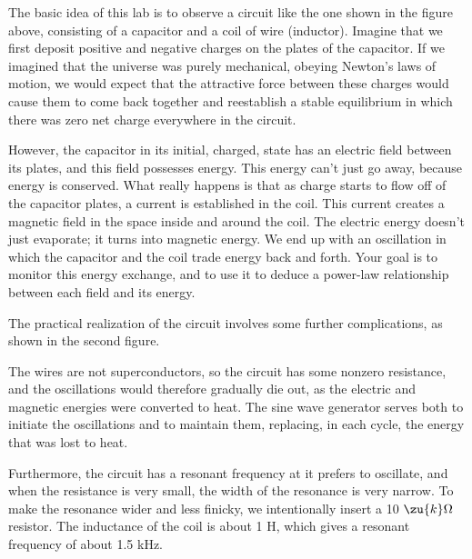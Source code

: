\label{lab:energy-in-fields}

\apparatus
{}


\introduction

The basic idea of this lab is to observe a circuit like the one shown in
the figure above, consisting of a capacitor and a coil of wire (inductor).
Imagine that we first deposit positive and negative
charges on the plates of the capacitor. If we imagined that the universe was
purely mechanical, obeying Newton's laws of motion,
we would expect that the attractive force between these charges
would cause them to come back together and reestablish a stable equilibrium
in which there was zero net charge everywhere in the circuit.

However, the capacitor in its initial, charged, state has an electric 
field between its plates, and this field possesses energy. This energy
can't just go away, because energy is conserved. What really happens is
that as charge starts to flow off of the capacitor plates, a current is
established in the coil. This current creates a magnetic field in the space
inside and around the coil. The electric energy doesn't just evaporate;
it turns into magnetic energy. We end up with an oscillation in which the
capacitor and the coil trade energy back and forth. Your goal is to
monitor this energy exchange, and to use it to deduce a power-law
relationship between each field and its energy.

The practical realization of the circuit involves some further
complications, as shown in the second figure. 

The wires are not superconductors, so the circuit
has some nonzero resistance, and the oscillations would therefore
gradually die out, as the electric and magnetic energies were
converted to heat. The sine wave generator serves both to
initiate the oscillations and to maintain them, replacing, in each cycle, the
energy that was lost to heat. 

Furthermore, the circuit has a resonant frequency at it
prefers to oscillate, and when the resistance is very small,
the width of the resonance is very narrow. To make the
resonance wider and less finicky, we intentionally insert
a 10 $\zu{k}\Omega$ resistor. The inductance of the coil is about 1 H, which
gives a resonant frequency of about 1.5 kHz.


